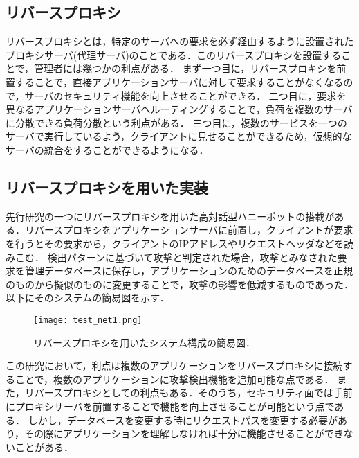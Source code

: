 \documentclass{css}
\begin{document}
\subsection{リバースプロキシ}
リバースプロキシ\cite{rev_proxy}とは，特定のサーバへの要求を必ず経由するように設置されたプロキシサーバ(代理サーバ)のことである．このリバースプロキシを設置することで，管理者には幾つかの利点がある．
まず一つ目に，リバースプロキシを前置することで，直接アプリケーションサーバに対して要求することがなくなるので，サーバのセキュリティ機能を向上させることができる．
二つ目に，要求を異なるアプリケーションサーバへルーティングすることで，負荷を複数のサーバに分散できる負荷分散という利点がある．
三つ目に，複数のサービスを一つのサーバで実行しているよう，クライアントに見せることができるため，仮想的なサーバの統合をすることができるようになる．
\subsection{リバースプロキシを用いた実装}
先行研究\cite{senko}の一つにリバースプロキシを用いた高対話型ハニーポットの搭載がある．リバースプロキシをアプリケーションサーバに前置し，クライアントが要求を行うとその要求から，クライアントのIPアドレスやリクエストヘッダなどを読みこむ．
検出パターンに基づいて攻撃と判定された場合，攻撃とみなされた要求を管理データベースに保存し，アプリケーションのためのデータベースを正規のものから擬似のものに変更することで，攻撃の影響を低減するものであった．以下にそのシステムの簡易図を示す．

\begin{figure}[ht]
\texttt{[image: test\_net1.png]}
\caption{リバースプロキシを用いたシステム構成の簡易図．}
\label{fig:one}
\end{figure}

この研究において，利点は複数のアプリケーションをリバースプロキシに接続することで，複数のアプリケーションに攻撃検出機能を追加可能な点である．
また，リバースプロキシとしての利点もある．そのうち，セキュリティ面では手前にプロキシサーバを前置することで機能を向上させることが可能という点である．
しかし，データベースを変更する時にリクエストパスを変更する必要があり，その際にアプリケーションを理解しなければ十分に機能させることができないことがある．
\end{document}
